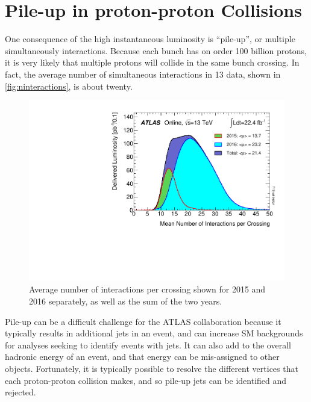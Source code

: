 \section{Pile-up in proton-proton Collisions}
\label{sec:pileup}

One consequence of the high instantaneous luminosity is ``pile-up'', or multiple simultaneously interactions. Because each bunch has on order 100 billion protons, it is very likely that multiple protons will collide in the same bunch crossing. In fact, the average number of simultaneous interactions in 13 \tev data, shown in \autoref{fig:ninteractions}, is about twenty. 

\begin{centering}
\begin{figure}[!hbt]
\myfloatalign
\includegraphics[width=.85\linewidth]{figures/atlas/mu_2015_2016_ICHEP.pdf}
\caption{Average number of interactions per crossing shown for 2015 and 2016 separately, as well as the sum of the two years.}
\label{fig:ninteractions}
\end{figure}
\end{centering}

Pile-up can be a difficult challenge for the ATLAS collaboration because it typically results in additional jets in an event, and can increase \ac{SM} backgrounds for analyses seeking to identify events with jets. It can also add to the overall hadronic energy of an event, and that energy can be mis-assigned to other objects. Fortunately, it is typically possible to resolve the different vertices that each proton-proton collision makes, and so pile-up jets can be identified and rejected. 


